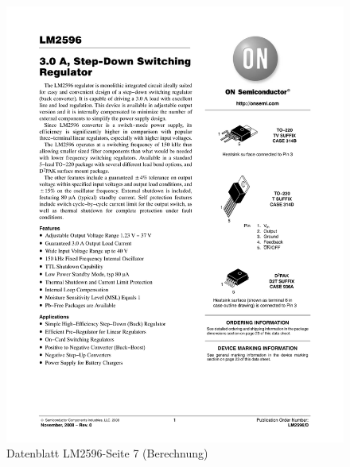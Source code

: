 \documentclass[12pt,a4paper]{article}
\begin{document}
{\begin{figure}[H]
  \centering
		\includegraphics[scale=0.75, angle=0,page=7]{graphics/LM2596.PDF}
		\caption{Datenblatt LM2596-Seite 7 (Berechnung)}
		\label{datasheet:LM2596-2}
\end{figure}

}
\end{document}

